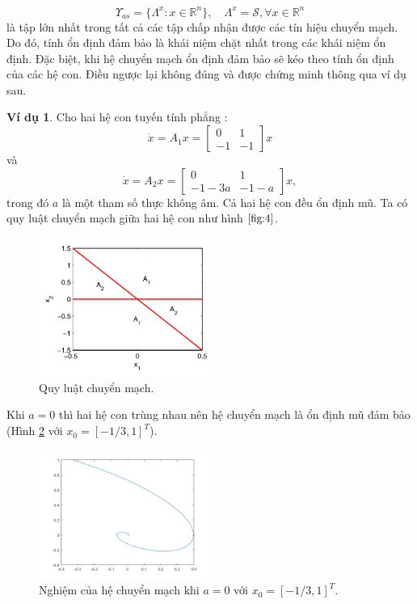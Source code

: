 \documentclass[14pt,a4paper,oneside]{report}		%
\theoremstyle{definition}
\newtheorem{example}[theorem]{Ví dụ}
\begin{document}
$$\Upsilon_{as}=\{\Lambda^x:x\in\mathbb{R}^n\},\quad \Lambda^x=\mathcal{S},\forall x\in\mathbb{R}^n$$
là tập lớn nhất trong tất cả các tập chấp nhận được các tín hiệu chuyển mạch. Do đó, tính ổn định đảm bảo là khái niệm chặt nhất trong các khái niệm ổn định. Đặc biệt, khi hệ chuyển mạch ổn định đảm bảo sẽ kéo theo tính ổn định của các hệ con. Điều ngược lại không đúng và được chứng minh thông qua ví dụ sau.\\
\begin{example}
Cho hai hệ con tuyến tính phẳng \cite{DATN5}:
$$\dot{x}=A_1x=
\begin{bmatrix}
0 & 1\\
-1 & -1
\end{bmatrix}x$$
và
$$\dot{x}=A_2x=
\begin{bmatrix}
0 & 1\\
-1-3a & -1-a
\end{bmatrix}x,$$
trong đó $a$ là một tham số thực không âm. Cả hai hệ con đều ổn định mũ. Ta có quy luật chuyển mạch giữa hai hệ con như hình $\ref{fig:4}$.\\
\newpage
\begin{figure}[h]
\centering
\includegraphics[width=0.5\textwidth]{graph12.png}
\caption{Quy luật chuyển mạch.}\label{fig:4}
\end{figure}
Khi $a=0$ thì hai hệ con trùng nhau nên hệ chuyển mạch là ổn định mũ đảm bảo (Hình \ref{fig:5} với $x_0=[-1/3,1]^T$).
\begin{figure}[h]
\centering
\includegraphics[width=0.5\textwidth]{graph7.png}
\caption{Nghiệm của hệ chuyển mạch khi $a=0$ với $x_0=[-1/3,1]^T$.}\label{fig:5}
\end{figure}


\end{example}
\end{document}
